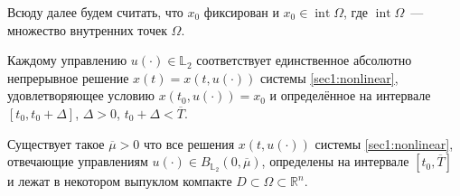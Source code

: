 \documentclass[../main.tex]{subfiles}
\begin{document}
	Всюду далее будем считать, что $x_0$ фиксирован и  $x_0 \in \operatorname{int} \Omega $, где $\operatorname{int} \Omega $~--- множество внутренних точек $\Omega$. 
%	
	
	Каждому управлению $ u(\cdot) \in \mathbb{L}_2 $ соответствует единственное абсолютно непрерывное решение $ x(t)=x(t,u(\cdot)) $ системы \eqref{sec1:nonlinear}, удовлетворяющее условию $ x(t_0, u(\cdot)) = x_0$ и определённое на интервале $ [t_0, t_0 + \Delta] $, $\Delta > 0$, $ t_0 + \Delta < \overline{T}$.

	\begin{assumption}\label{as:right_hand_side_conditions_global}
		Существует такое $\overline{\mu} > 0 $ что все решения $ x(t, u(\cdot)) $ системы \eqref{sec1:nonlinear}, отвечающие управлениям $u(\cdot) \in B_{\mathbb{L}_2}(0,\overline{\mu})$,  определены на интервале $ [t_0,\overline{T}] $ и лежат в некотором выпуклом компакте $D \subset \Omega \subset \mathbb{R}^n$. 
	\end{assumption}
	
\end{document}
